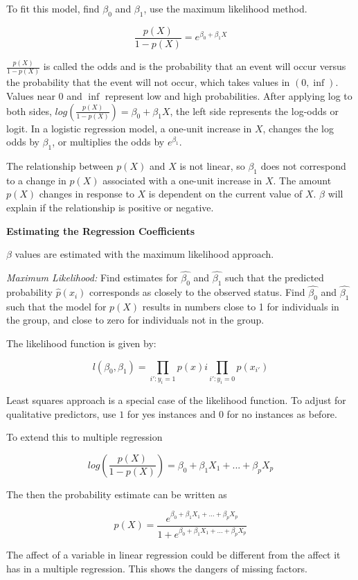\documentclass[
]{article}
\begin{document}
To fit this model, find \(\beta_0\) and \(\beta_1\), use the maximum
likelihood method.

\[\frac{p(X)}{1-p(X)} = e^{\beta_0+\beta_1X}\]

\(\frac{p(X)}{1-p(X)}\) is called the odds and is the probability that
an event will occur versus the probability that the event will not
occur, which takes values in \((0,\inf)\). Values near \(0\) and
\(\inf\) represent low and high probabilities. After applying log to
both sides, \(log(\frac{p(X)}{1-p(X)}) = \beta_0+\beta_1X\), the left
side represents the log-odds or logit. In a logistic regression model, a
one-unit increase in \(X\), changes the log odds by \(\beta_1\), or
multiplies the odds by \(e^{\beta_1}\).

The relationship between \(p(X)\) and \(X\) is not linear, so
\(\beta_1\) does not correspond to a change in \(p(X)\) associated with
a one-unit increase in \(X\). The amount \(p(X)\) changes in response to
\(X\) is dependent on the current value of \(X\). \(\beta\) will explain
if the relationship is positive or negative.

\textbf{Estimating the Regression Coefficients}

\(\beta\) values are estimated with the maximum likelihood approach.

\emph{Maximum Likelihood:} Find estimates for \(\hat{\beta_0}\) and
\(\hat{\beta_1}\) such that the predicted probability \(\hat{p}(x_i)\)
corresponds as closely to the observed status. Find \(\hat{\beta_0}\)
and \(\hat{\beta_1}\) such that the model for \(p(X)\) results in
numbers close to 1 for individuals in the group, and close to zero for
individuals not in the group.

The likelihood function is given by:

\[l(\beta_0, \beta_1) = \prod_{i':y_i=1}p(x)i\prod_{i':y_i=0}p(x_{i'})\]

Least squares approach is a special case of the likelihood function. To
adjust for qualitative predictors, use \(1\) for yes instances and \(0\)
for no instances as before.

To extend this to multiple regression

\[log(\frac{p(X)}{1-p(X)}) = \beta_0 + \beta_1X_1 + ... + \beta_pX_p\]

The then the probability estimate can be written as

\[p(X) = \frac{e^{\beta_0+\beta_1X_1+...+\beta_pX_p}}{1+e^{\beta_0+\beta_1X_1+...+\beta_pX_p} }\]

The affect of a variable in linear regression could be different from
the affect it has in a multiple regression. This shows the dangers of
missing factors.
\end{document}
